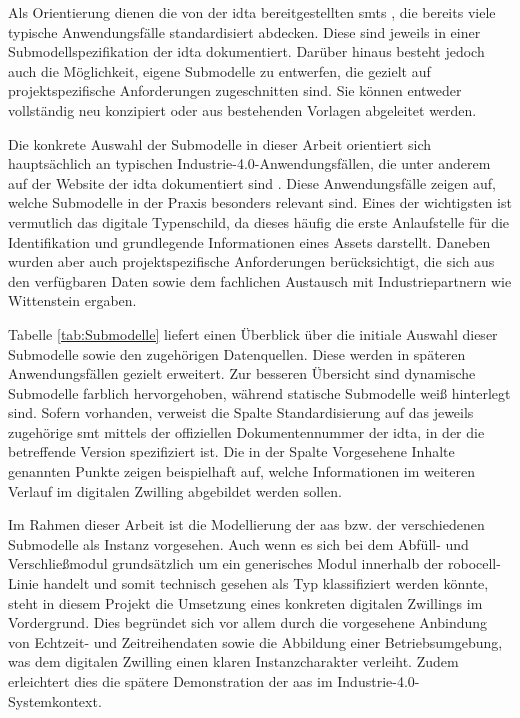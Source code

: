 Als Orientierung dienen die von der \acs{idta} bereitgestellten \acsp{smt} \cite{idtaTemplates}, die bereits viele typische Anwendungsfälle standardisiert abdecken.
Diese sind jeweils in einer Submodellspezifikation der \acs{idta} dokumentiert.
Darüber hinaus besteht jedoch auch die Möglichkeit, eigene Submodelle zu entwerfen, die gezielt auf projektspezifische Anforderungen zugeschnitten sind.
Sie können entweder vollständig neu konzipiert oder aus bestehenden Vorlagen abgeleitet werden.

Die konkrete Auswahl der Submodelle in dieser Arbeit orientiert sich hauptsächlich an typischen Industrie-4.0-Anwendungsfällen, die unter anderem auf der Website der \acs{idta} dokumentiert sind \cite{idtaUseCases}.
Diese Anwendungsfälle zeigen auf, welche Submodelle in der Praxis besonders relevant sind.
Eines der wichtigsten ist vermutlich das digitale Typenschild, da dieses häufig die erste Anlaufstelle für die Identifikation und grundlegende Informationen eines Assets darstellt.
Daneben wurden aber auch projektspezifische Anforderungen berücksichtigt, die sich aus den verfügbaren Daten sowie dem fachlichen Austausch mit Industriepartnern wie Wittenstein ergaben.

Tabelle \ref{tab:Submodelle} liefert einen Überblick über die initiale Auswahl dieser Submodelle sowie den zugehörigen Datenquellen.
Diese werden in späteren Anwendungsfällen gezielt erweitert.
Zur besseren Übersicht sind dynamische Submodelle farblich hervorgehoben, während statische Submodelle weiß hinterlegt sind.
Sofern vorhanden, verweist die Spalte Standardisierung auf das jeweils zugehörige \acs{smt} mittels der offiziellen Dokumentennummer der \acs{idta}, in der die betreffende Version spezifiziert ist.
Die in der Spalte Vorgesehene Inhalte genannten Punkte zeigen beispielhaft auf, welche Informationen im weiteren Verlauf im digitalen Zwilling abgebildet werden sollen.

\vspace{-0.25em}


\newpage
Im Rahmen dieser Arbeit ist die Modellierung der \acs{aas} bzw. der verschiedenen Submodelle als Instanz vorgesehen.
Auch wenn es sich bei dem Abfüll- und Verschließmodul grundsätzlich um ein generisches Modul innerhalb der robocell-Linie handelt und somit technisch gesehen als Typ klassifiziert werden könnte, steht in diesem Projekt die Umsetzung eines konkreten digitalen Zwillings im Vordergrund.
Dies begründet sich vor allem durch die vorgesehene Anbindung von Echtzeit- und Zeitreihendaten sowie die Abbildung einer Betriebsumgebung, was dem digitalen Zwilling einen klaren Instanzcharakter verleiht.
Zudem erleichtert dies die spätere Demonstration der \acs{aas} im Industrie-4.0-Systemkontext.

